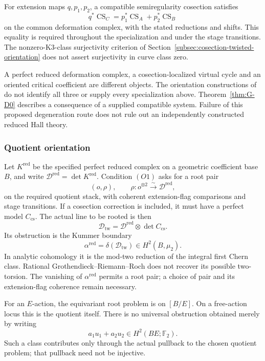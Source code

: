 For extension maps \(q,p_1,p_2\), a compatible semiregularity
cosection satisfies
\[
 q^*\operatorname{CS}_{C}
   =p_1^*\operatorname{CS}_{A}+p_2^*\operatorname{CS}_{B}
\]
on the common deformation complex, with the stated reductions and
shifts. This equality is required throughout the specialization and
under the stage transitions. The nonzero-K3-class surjectivity
criterion of Section~\ref{subsec:cosection-twisted-orientation} does
not assert surjectivity in curve class zero.

A perfect reduced deformation complex, a cosection-localized virtual
cycle and an oriented critical coefficient are different objects.
The orientation constructions of \cite{JoyceSong,JoyceUpmeier}
do not identify all three or supply every specialization above.
Theorem~\ref{thm:G-D0} describes a consequence of a supplied compatible
system. Failure of this proposed degeneration route does not rule out
an independently constructed reduced Hall theory.

\subsubsection*{Quotient orientation}

Let \(K^{\mathrm{red}}\) be the specified perfect reduced complex on
a geometric coefficient base \(B\), and write
\(\mathscr D^{\mathrm{red}}=\det K^{\mathrm{red}}\).
Condition \((O1)\) asks for a root pair
\[
 (o,\rho),\qquad
 \rho:o^{\otimes2}\xrightarrow{\sim}\mathscr D^{\mathrm{red}},
\]
on the required quotient stack, with coherent extension-flag
comparisons and stage transitions.
If a cosection correction is included, it must have a perfect model
\(C_{\mathrm{cs}}\). The actual line to be rooted is then
\[
 \mathscr D_{\mathrm{tw}}=
 \mathscr D^{\mathrm{red}}\otimes\det C_{\mathrm{cs}}.
\]
Its obstruction is the Kummer boundary
\[
 \alpha^{\mathrm{red}}=\delta(\mathscr D_{\mathrm{tw}})
       \in H^2(B,\mu_2).
\]
In analytic cohomology it is the mod-two reduction of the integral
first Chern class. Rational Grothendieck--Riemann--Roch does not
recover its possible two-torsion. The vanishing of
\(\alpha^{\mathrm{red}}\) permits a root pair; a choice of pair
and its extension-flag coherence remain necessary.

For an \(E\)-action, the equivariant root problem is on \([B/E]\).
On a free-action locus this is the quotient itself. There is no
universal obstruction obtained merely by writing
\[
 a_1u_1+a_2u_2\in H^2(BE;\mathbb F_2).
\]
Such a class contributes only through the actual pullback to the
chosen quotient problem; that pullback need not be injective.

